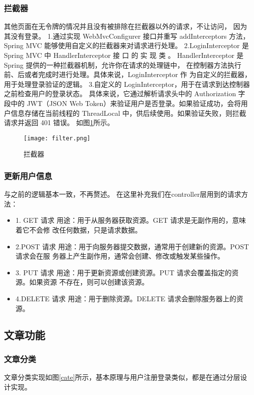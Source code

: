 \documentclass[bachelor]{thesis-uestc}
\begin{document}
\subsubsection{拦截器}
其他页面在无令牌的情况并且没有被排除在拦截器以外的请求，不让访问，
因为其没有登录。
1.通过实现 WebMvcConfigurer 接口并重写 addInterceptors 方法，Spring MVC
能够使用自定义的拦截器来对请求进行处理。
2.LoginInterceptor 是 Spring MVC 中 HandlerInterceptor 接 口 的 实 现 类 。
HandlerInterceptor 是 Spring 提供的一种拦截器机制，允许你在请求的处理链中，
在控制器方法执行前、后或者完成时进行处理。具体来说，LoginInterceptor 作
为自定义的拦截器，用于处理登录验证的逻辑。
3.自定义的 LoginInterceptor，用于在请求到达控制器之前检查用户的登录状态。
具体来说，它通过解析请求头中的 Authorization 字段中的 JWT（JSON Web
Token）来验证用户是否登录。如果验证成功，会将用户信息存储在当前线程的
ThreadLocal 中，供后续使用。如果验证失败，则拦截请求并返回 401 错误。
如图\ref{fi}所示。
\begin{figure}[htbp]
    \centering
    \texttt{[image: filter.png]}
    \caption{拦截器}
    \label{fi}
\end{figure}

\subsubsection{更新用户信息}
与之前的逻辑基本一致，不再赘述。
在这里补充我们在controller层用到的请求方法：
\begin{itemize}
\item 1. GET 请求
用途：用于从服务器获取资源。GET 请求是无副作用的，意味着它不会修
改任何数据，只是请求数据。
\item 2.POST 请求
用途：用于向服务器提交数据，通常用于创建新的资源。POST 请求会在服
务器上产生副作用，通常会创建、修改或触发某些操作。
\item 3. PUT 请求
用途：用于更新资源或创建资源。PUT 请求会覆盖指定的资源。如果资源
不存在，则可以创建该资源。
\item 4.DELETE 请求
用途：用于删除资源。DELETE 请求会删除服务器上的资源。
\end{itemize}
\subsection{文章功能}
\subsubsection{文章分类}
文章分类实现如图\ref{cate}所示，基本原理与用户注册登录类似，都是在通过分层设计实现。
\end{document}
